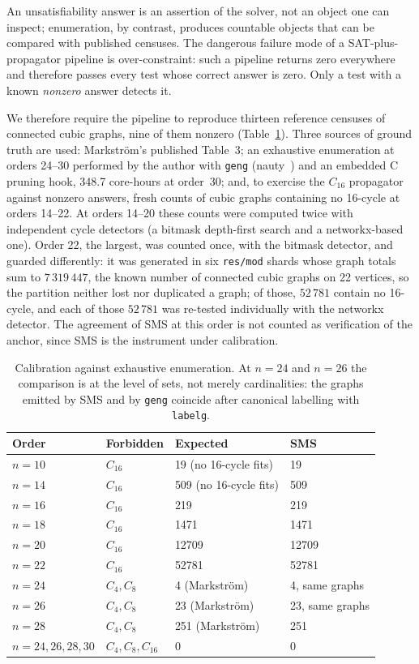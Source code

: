 \documentclass[11pt]{article}
\begin{document}
An unsatisfiability answer is an assertion of the solver, not an object one can
inspect; enumeration, by contrast, produces countable objects that can be
compared with published censuses. The dangerous failure mode of a
SAT-plus-propagator pipeline is over-constraint: such a pipeline returns zero
everywhere and therefore passes every test whose correct answer is zero. Only a
test with a known \emph{nonzero} answer detects it.

We therefore require the pipeline to reproduce thirteen reference censuses of
connected cubic graphs, nine of them nonzero (Table~\ref{tab:calib}). Three
sources of ground truth are used: Markstr\"om's published Table~3; an
exhaustive enumeration at orders 24--30 performed by the author with
\texttt{geng} (nauty~\cite{nauty}) and an embedded C pruning hook, 348.7
core-hours at order~30; and, to exercise the $C_{16}$ propagator against
nonzero answers, fresh counts of cubic graphs containing no 16-cycle at orders
14--22. At orders 14--20 these counts were computed twice with independent
cycle detectors (a bitmask depth-first search and a networkx-based one). Order
22, the largest, was counted once, with the bitmask detector, and guarded
differently: it was generated in six \texttt{res/mod} shards whose graph totals
sum to $7\,319\,447$, the known number of connected cubic graphs on 22
vertices, so the partition neither lost nor duplicated a graph; of those,
$52\,781$ contain no 16-cycle, and each of those $52\,781$ was re-tested
individually with the networkx detector. The agreement of SMS at this order is
not counted as verification of the anchor, since SMS is the instrument under
calibration.

\begin{table}[h]\centering
\begin{tabular}{llll}
\toprule
Order & Forbidden & Expected & SMS \\
\midrule
$n=10$ & $C_{16}$ & 19 (no 16-cycle fits) & 19 \\
$n=14$ & $C_{16}$ & 509 (no 16-cycle fits) & 509 \\
$n=16$ & $C_{16}$ & 219 & 219 \\
$n=18$ & $C_{16}$ & 1471 & 1471 \\
$n=20$ & $C_{16}$ & 12709 & 12709 \\
$n=22$ & $C_{16}$ & 52781 & 52781 \\
$n=24$ & $C_4,C_8$ & 4 (Markstr\"om) & 4, same graphs \\
$n=26$ & $C_4,C_8$ & 23 (Markstr\"om) & 23, same graphs \\
$n=28$ & $C_4,C_8$ & 251 (Markstr\"om) & 251 \\
$n=24,26,28,30$ & $C_4,C_8,C_{16}$ & 0 & 0 \\
\bottomrule
\end{tabular}
\caption{Calibration against exhaustive enumeration. At $n=24$ and $n=26$ the
comparison is at the level of sets, not merely cardinalities: the graphs
emitted by SMS and by \texttt{geng} coincide after canonical labelling with
\texttt{labelg}.}\label{tab:calib}
\end{table}
\end{document}
